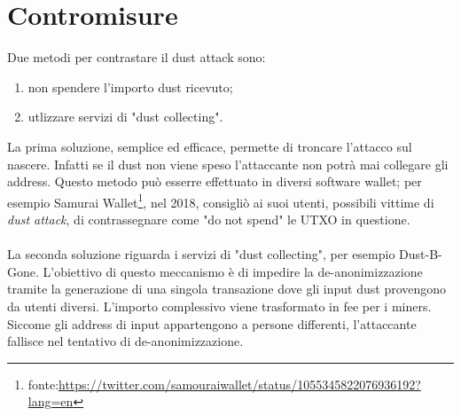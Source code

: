 \section{Contromisure}
Due metodi per contrastare il dust attack sono:
    \begin{enumerate}
        \item non spendere l'importo dust ricevuto; 
        \item utlizzare servizi di "dust collecting". 
    \end{enumerate}
La prima soluzione, semplice ed efficace, permette di troncare l'attacco sul nascere. Infatti se il dust non viene speso l'attaccante non potrà mai collegare gli address. 
Questo metodo può esserre effettuato in diversi software wallet; per esempio Samurai Wallet\footnote{fonte:\url{https://twitter.com/samouraiwallet/status/1055345822076936192?lang=en}}, nel 2018, consigliò ai suoi utenti, possibili vittime di \textit{dust attack},  di contrassegnare come "do not spend" le UTXO in questione.\\\\
La seconda soluzione riguarda i servizi di "dust collecting", per esempio Dust-B-Gone\cite{Dbg}.
L'obiettivo di questo meccanismo è di impedire la de-anonimizzazione tramite la generazione di una singola transazione dove gli input dust provengono da utenti diversi. L'importo complessivo viene trasformato in fee per i miners. \\Siccome gli address di input appartengono a persone differenti, l'attaccante fallisce nel tentativo di de-anonimizzazione.